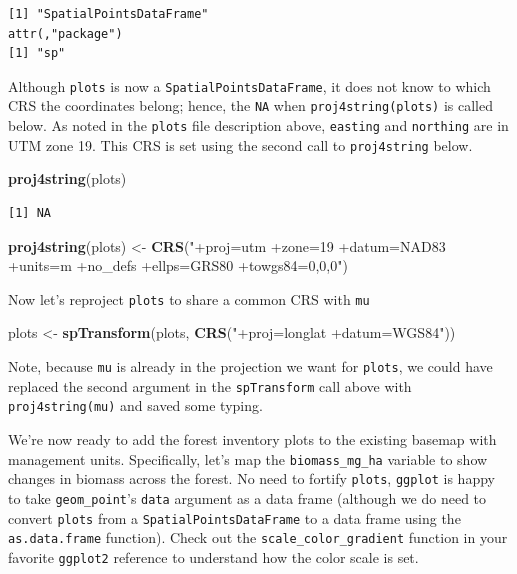 \documentclass[
]{krantz}
\makeatletter
\newenvironment{Shaded}{\begin{snugshade}}{\end{snugshade}}
\newcommand{\KeywordTok}[1]{\textcolor[rgb]{0.27,0.27,0.27}{\textbf{#1}}}
\newcommand{\NormalTok}[1]{#1}
\newcommand{\StringTok}[1]{\textcolor[rgb]{0.5,0.5,0.5}{#1}}
\newenvironment{kframe}{%
\medskip{}
\setlength{\fboxsep}{.8em}
 \def\at@end@of@kframe{}%
 \ifinner\ifhmode%
  \def\at@end@of@kframe{\end{minipage}}%
  \begin{minipage}{\columnwidth}%
 \fi\fi%
 \def\FrameCommand##1{\hskip\@totalleftmargin \hskip-\fboxsep
 \colorbox{shadecolor}{##1}\hskip-\fboxsep
     \hskip-\linewidth \hskip-\@totalleftmargin \hskip\columnwidth}%
 \MakeFramed {\advance\hsize-\width
   \@totalleftmargin\z@ \linewidth\hsize
   \@setminipage}}%
 {\par\unskip\endMakeFramed%
 \at@end@of@kframe}
\renewenvironment{Shaded}{\begin{kframe}}{\end{kframe}}
\makeatother
\begin{document}
\begin{verbatim}
[1] "SpatialPointsDataFrame"
attr(,"package")
[1] "sp"
\end{verbatim}

Although \texttt{plots} is now a \texttt{SpatialPointsDataFrame}, it does not know to which CRS the coordinates belong; hence, the \texttt{NA} when \texttt{proj4string(plots)} is called below. As noted in the \texttt{plots} file description above, \texttt{easting} and \texttt{northing} are in UTM zone 19. This CRS is set using the second call to \texttt{proj4string} below.

\begin{Shaded}
\begin{Highlighting}[]
\KeywordTok{proj4string}\NormalTok{(plots)}
\end{Highlighting}
\end{Shaded}

\begin{verbatim}
[1] NA
\end{verbatim}

\begin{Shaded}
\begin{Highlighting}[]
\KeywordTok{proj4string}\NormalTok{(plots) \textless{}{-}}\StringTok{ }\KeywordTok{CRS}\NormalTok{(}\StringTok{"+proj=utm +zone=19 +datum=NAD83 +units=m }
\StringTok{                             +no\_defs +ellps=GRS80 +towgs84=0,0,0"}\NormalTok{)                   }
\end{Highlighting}
\end{Shaded}

Now let's reproject \texttt{plots} to share a common CRS with \texttt{mu}

\begin{Shaded}
\begin{Highlighting}[]
\NormalTok{plots \textless{}{-}}\StringTok{ }\KeywordTok{spTransform}\NormalTok{(plots, }\KeywordTok{CRS}\NormalTok{(}\StringTok{"+proj=longlat +datum=WGS84"}\NormalTok{))}
\end{Highlighting}
\end{Shaded}

Note, because \texttt{mu} is already in the projection we want for \texttt{plots}, we could have replaced the second argument in the \texttt{spTransform} call above with \texttt{proj4string(mu)} and saved some typing.

We're now ready to add the forest inventory plots to the existing basemap with management units. Specifically, let's map the \texttt{biomass\_mg\_ha} variable to show changes in biomass across the forest. No need to fortify \texttt{plots}, \texttt{ggplot} is happy to take \texttt{geom\_point}'s \texttt{data} argument as a data frame (although we do need to convert \texttt{plots} from a \texttt{SpatialPointsDataFrame} to a data frame using the \texttt{as.data.frame} function). Check out the \texttt{scale\_color\_gradient} function in your favorite \texttt{ggplot2} reference to understand how the color scale is set.
\end{document}

